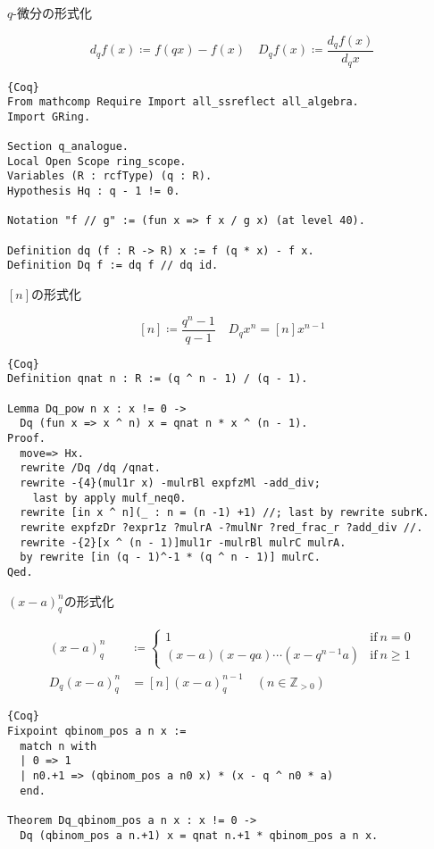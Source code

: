\documentclass[dvipdfmx,cjk]{beamer}
\theoremstyle{mystyle}
\newcommand{\Z}{\mathbb{Z}}
\newcommand{\0}{\textbf{0}}
\begin{document}
\begin{frame}[fragile]{$q$-微分の形式化}
	\begin{screen}
		\[
			d_q f (x) \coloneqq f(qx) - f(x) \quad D_q f (x) \coloneqq \frac{d_q f(x)}{d_q x}
		\]
	\end{screen} \pause
	\begin{lstlisting}{Coq}
From mathcomp Require Import all_ssreflect all_algebra.
Import GRing.

Section q_analogue.
Local Open Scope ring_scope.
Variables (R : rcfType) (q : R).
Hypothesis Hq : q - 1 != 0.

Notation "f // g" := (fun x => f x / g x) (at level 40).

Definition dq (f : R -> R) x := f (q * x) - f x.
Definition Dq f := dq f // dq id. \end{lstlisting}
\end{frame}

\begin{frame}[fragile]{$[n]$の形式化}
	\begin{screen}
		\[
			[n] \coloneqq \frac{q^n - 1}{q - 1} \quad D_q x^n = [n] x^{n - 1}
		\]
	\end{screen} \pause
	\begin{lstlisting}{Coq}
Definition qnat n : R := (q ^ n - 1) / (q - 1).

Lemma Dq_pow n x : x != 0 ->
  Dq (fun x => x ^ n) x = qnat n * x ^ (n - 1).
Proof.
  move=> Hx.
  rewrite /Dq /dq /qnat.
  rewrite -{4}(mul1r x) -mulrBl expfzMl -add_div;
    last by apply mulf_neq0.
  rewrite [in x ^ n](_ : n = (n -1) +1) //; last by rewrite subrK.
  rewrite expfzDr ?expr1z ?mulrA -?mulNr ?red_frac_r ?add_div //.
  rewrite -{2}[x ^ (n - 1)]mul1r -mulrBl mulrC mulrA.
  by rewrite [in (q - 1)^-1 * (q ^ n - 1)] mulrC.
Qed. \end{lstlisting}
\end{frame}

\begin{frame}[fragile]{$(x - a)^n_q$の形式化}
	\begin{screen}
		\begin{align*}
			(x - a)^n_q &\coloneqq \begin{cases}
	                      1 & \text{if}\ n = 0 \\
	                      (x - a) (x - qa) \cdots (x - q^{n - 1} a) & \text{if}\ n \ge 1
	                    \end{cases} \\
			D_q (x - a)^n_q &= [n](x - a)^{n - 1}_q \quad (n \in \Z_{>0})
		\end{align*}
	\end{screen} \pause
	\begin{lstlisting}{Coq}
Fixpoint qbinom_pos a n x :=
  match n with
  | 0 => 1
  | n0.+1 => (qbinom_pos a n0 x) * (x - q ^ n0 * a)
  end. 
  
Theorem Dq_qbinom_pos a n x : x != 0 ->
  Dq (qbinom_pos a n.+1) x = qnat n.+1 * qbinom_pos a n x. \end{lstlisting}
\end{frame}
\end{document}
